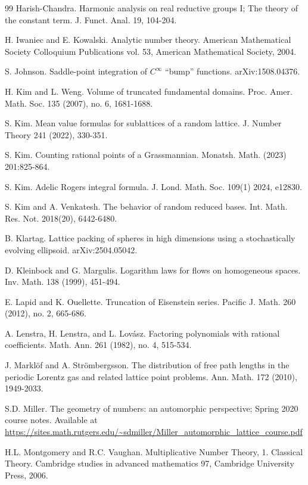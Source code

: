 \documentclass[11pt]{amsart}
\numberwithin{theorem}{section}
\numberwithin{equation}{section}
\theoremstyle{remark}
\theoremstyle{definition}
\begin{document}
\begin{thebibliography}{99}
 Harish-Chandra. Harmonic analysis on real reductive groups I; The theory of the constant term. J. Funct. Anal. 19, 104-204.

 H. Iwaniec and E. Kowalski. Analytic number theory. American Mathematical Society Colloquium Publications vol. 53, American Mathematical Society, 2004.

 S. Johnson. Saddle-point integration of $C^\infty$ ``bump'' functions. arXiv:1508.04376.

 H. Kim and L. Weng. Volume of truncated fundamental domains. Proc. Amer. Math. Soc. 135 (2007), no. 6, 1681-1688.

 S. Kim. Mean value formulas for sublattices of a random lattice. J. Number Theory 241 (2022),
330-351.

 S. Kim. Counting rational points of a Grassmannian. Monatsh. Math. (2023) 201:825-864.

 S. Kim. Adelic Rogers integral formula. J. Lond. Math. Soc. 109(1) 2024, e12830.

 S. Kim and A. Venkatesh. The behavior of random reduced bases. Int. Math. Res. Not. 2018(20), 6442-6480.

 B. Klartag. Lattice packing of spheres in high dimensions using a stochastically evolving ellipsoid. arXiv:2504.05042.

 D. Kleinbock and G. Margulis. Logarithm laws for flows on homogeneous spaces. Inv. Math. 138 (1999), 451-494.

 E. Lapid and K. Ouellette. Truncation of Eisenstein series. Pacific J. Math. 260 (2012), no. 2, 665-686.

 A. Lenstra, H. Lenstra, and L. Lov\'asz. Factoring polynomials with rational coefficients. Math. Ann. 261 (1982), no. 4, 515-534.

 J. Markl\"of and A. Str\"ombergsson. The distribution of free path lengths in the periodic Lorentz gas and related lattice point problems. Ann. Math. 172 (2010), 1949-2033.

 S.D. Miller. The geometry of numbers: an automorphic perspective; Spring 2020 course notes. Available at \url{https://sites.math.rutgers.edu/~sdmiller/Miller_automorphic_lattice_course.pdf}

 H.L. Montgomery and R.C. Vaughan. Multiplicative Number Theory, 1. Classical Theory. Cambridge studies in advanced mathematics 97, Cambridge University Press, 2006.


\end{thebibliography}
\end{document}
